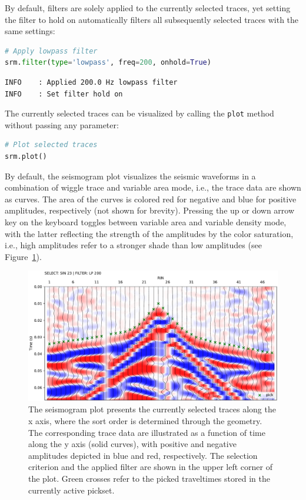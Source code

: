 \documentclass[a4paper,fleqn]{cas-sc}
\begin{document}
By default, filters are solely applied to the currently selected traces, yet setting the filter to hold on automatically filters all subsequently selected traces with the same settings:
\begin{lstlisting}[language=Python, firstnumber=16]
# Apply lowpass filter
srm.filter(type='lowpass', freq=200, onhold=True)
\end{lstlisting}
\begin{footnotesize}
\begin{verbatim}
INFO    : Applied 200.0 Hz lowpass filter
INFO    : Set filter hold on
\end{verbatim}
\end{footnotesize}

The currently selected traces can be visualized by calling the \texttt{plot} method without passing any parameter:
\begin{lstlisting}[language=Python, firstnumber=18]
# Plot selected traces
srm.plot()
\end{lstlisting}
By default, the seismogram plot visualizes the seismic waveforms in a combination of wiggle trace and variable area mode, i.e., the trace data are shown as curves. The area of the curves is colored red for negative and blue for positive amplitudes, respectively (not shown for brevity). Pressing the up or down arrow key on the keyboard toggles between variable area and variable density mode, with the latter reflecting the strength of the amplitudes by the color saturation, i.e., high amplitudes refer to a stronger shade than low amplitudes (see Figure~\ref{fig:srm_intro}).
\begin{figure}
	\centering
	\includegraphics[width=.75\textwidth]{figures/srm_intro.pdf}
	\caption{The seismogram plot presents the currently selected traces along the x axis, where the sort order is determined through the geometry. The corresponding trace data are illustrated as a function of time along the y axis (solid curves), with positive and negative amplitudes depicted in blue and red, respectively. The selection criterion and the applied filter are shown in the upper left corner of the plot. Green crosses refer to the picked traveltimes stored in the currently active pickset.}
	\label{fig:srm_intro}
\end{figure}
\end{document}
